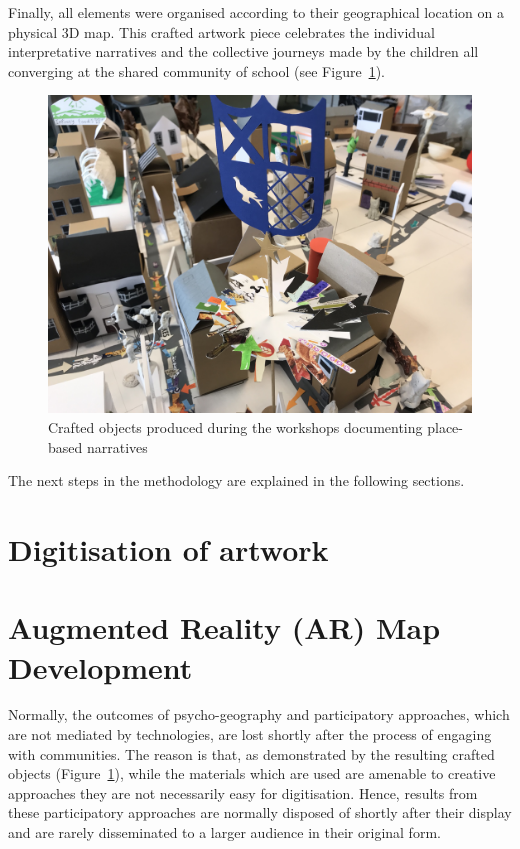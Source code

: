\documentclass[acmlarge,screen,dvipsnames]{acmart}
\begin{document}
Finally, all elements were organised according to their geographical location
on a physical 3D map. This crafted artwork piece celebrates the individual
interpretative narratives and the collective journeys made by the children all
converging at the shared community of school (see Figure~\ref{fig:artwork}). 

\begin{figure}[ht] \centering
\includegraphics[width=\linewidth]{images/variousassets.jpg}
\caption{Crafted objects produced during the workshops documenting place-based
narratives} \label{fig:artwork} \end{figure}

The next steps in the methodology are explained in the following sections.

\section{Digitisation of artwork} 
\label{dig} 


\section{Augmented Reality (AR) Map Development} \label{tech} Normally, the
outcomes of psycho-geography and participatory approaches, which are not
mediated by technologies, are lost shortly after the process of engaging with
communities. The reason is that, as demonstrated by the resulting crafted
objects (Figure~\ref{fig:artwork}), while the materials which are used  are
amenable to creative approaches they are not necessarily easy for
digitisation. Hence, results from these participatory approaches are normally
disposed of shortly after their display and are rarely disseminated to
 a larger audience in their original form. 
\end{document}
